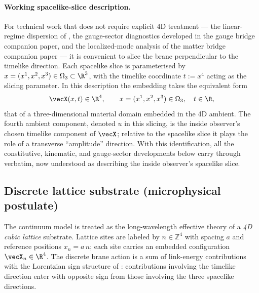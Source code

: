 \paragraph{Working spacelike-slice description.}
For technical work that does not require explicit 4D treatment --- the linear-regime dispersion of , the gauge-sector diagnostics developed in the gauge bridge companion paper, and the localized-mode analysis of the matter bridge companion paper --- it is convenient to slice the brane perpendicular to the timelike direction.
Each spacelike slice is parameterised by $x=(x^1,x^2,x^3)\in\Omega_3\subset\R^3$, with the timelike coordinate $t:=x^4$ acting as the slicing parameter.
In this description the embedding takes the equivalent form
\begin{equation}
  \vecX(x,t)\in\R^4,
  \qquad x=(x^1,x^2,x^3)\in\Omega_3,\quad t\in\R,
  \label{eq:fundamental-field-sliced}
\end{equation}
that of a three-dimensional material domain embedded in the 4D ambient.
The fourth ambient component, denoted $u$ in this slicing, is the inside observer's chosen timelike component of $\vecX$; relative to the spacelike slice it plays the role of a transverse ``amplitude'' direction.
With this identification, all the constitutive, kinematic, and gauge-sector developments below carry through verbatim, now understood as describing the inside observer's spacelike slice.

\subsection{Discrete lattice substrate (microphysical postulate)}
\label{subsec:lattice-substrate}

The continuum model is treated as the long-wavelength effective theory of a \emph{4D cubic lattice} substrate.
Lattice sites are labeled by $n\in\mathbb{Z}^4$ with spacing $a$ and reference positions $x_n=a\,n$; each site carries an embedded configuration $\vecX_n\in\R^4$.
The discrete brane action is a sum of link-energy contributions with the Lorentzian sign structure of : contributions involving the timelike direction enter with opposite sign from those involving the three spacelike directions.

